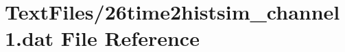 \hypertarget{26time2histsim__channel1_8dat}{}\section{Text\+Files/26time2histsim\+\_\+channel1.dat File Reference}
\label{26time2histsim__channel1_8dat}
